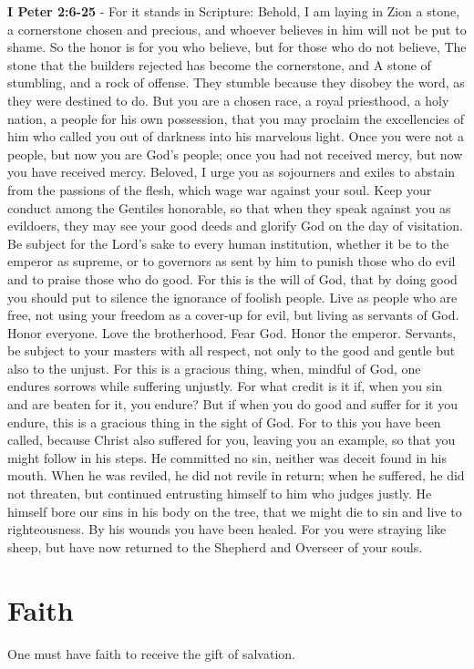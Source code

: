 \documentclass[11pt]{article}
\begin{document}
\textbf{I Peter 2:6-25} - For it stands in Scripture: Behold, I am laying in Zion a stone, a cornerstone chosen and precious, and whoever believes in him will not be put to shame.  So the honor is for you who believe, but for those who do not believe, The stone that the builders rejected has become the cornerstone, and A stone of stumbling, and a rock of offense. They stumble because they disobey the word, as they were destined to do.  But you are a chosen race, a royal priesthood, a holy nation, a people for his own possession, that you may proclaim the excellencies of him who called you out of darkness into his marvelous light.  Once you were not a people, but now you are God's people; once you had not received mercy, but now you have received mercy.  Beloved, I urge you as sojourners and exiles to abstain from the passions of the flesh, which wage war against your soul.  Keep your conduct among the Gentiles honorable, so that when they speak against you as evildoers, they may see your good deeds and glorify God on the day of visitation.  Be subject for the Lord's sake to every human institution, whether it be to the emperor as supreme, or to governors as sent by him to punish those who do evil and to praise those who do good.  For this is the will of God, that by doing good you should put to silence the ignorance of foolish people.  Live as people who are free, not using your freedom as a cover-up for evil, but living as servants of God.  Honor everyone. Love the brotherhood. Fear God. Honor the emperor.  Servants, be subject to your masters with all respect, not only to the good and gentle but also to the unjust.  For this is a gracious thing, when, mindful of God, one endures sorrows while suffering unjustly.  For what credit is it if, when you sin and are beaten for it, you endure? But if when you do good and suffer for it you endure, this is a gracious thing in the sight of God.  For to this you have been called, because Christ also suffered for you, leaving you an example, so that you might follow in his steps.  He committed no sin, neither was deceit found in his mouth.  When he was reviled, he did not revile in return; when he suffered, he did not threaten, but continued entrusting himself to him who judges justly.  He himself bore our sins in his body on the tree, that we might die to sin and live to righteousness. By his wounds you have been healed.  For you were straying like sheep, but have now returned to the Shepherd and Overseer of your souls.

\section{Faith}
\label{sec:orgd99074b}
One must have faith to receive the gift of salvation.
\end{document}
